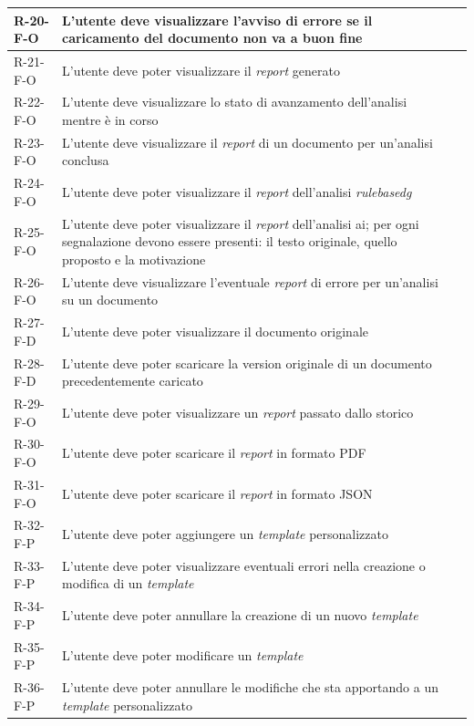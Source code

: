 \begin{xltabular}{\textwidth}{lXl}
    R-20-F-O & L'utente deve visualizzare l'avviso di errore se il caricamento del documento non va a buon fine &  \\ \hline
    R-21-F-O & L'utente deve poter visualizzare il \emph{report} generato &  \\ \hline
    R-22-F-O & L'utente deve visualizzare lo stato di avanzamento dell'analisi mentre è in corso &  \\ \hline
    R-23-F-O & L'utente deve visualizzare il \emph{report} di un documento per un'analisi conclusa &  \\ \hline
    R-24-F-O & L'utente deve poter visualizzare il \emph{report} dell'analisi \emph{\gls{rulebasedg}} &  \\ \hline
    R-25-F-O & L'utente deve poter visualizzare il \emph{report} dell'analisi ai; per ogni segnalazione devono essere presenti: il testo originale, quello proposto e la motivazione &  \\ \hline
    R-26-F-O & L'utente deve visualizzare l'eventuale \emph{report} di errore per un'analisi su un documento &  \\ \hline
    R-27-F-D & L'utente deve poter visualizzare il documento originale &  \\ \hline
    R-28-F-D & L'utente deve poter scaricare la version originale di un documento precedentemente caricato &  \\ \hline
    R-29-F-O & L'utente deve poter visualizzare un \emph{report} passato dallo storico &  \\ \hline
    R-30-F-O & L'utente deve poter scaricare il \emph{report} in formato PDF &  \\ \hline
    R-31-F-O & L'utente deve poter scaricare il \emph{report} in formato JSON &  \\ \hline
    R-32-F-P & L'utente deve poter aggiungere un \emph{template} personalizzato &  \\ \hline
    R-33-F-P & L'utente deve poter visualizzare eventuali errori nella creazione o modifica di un \emph{template} &  \\ \hline
    R-34-F-P & L'utente deve poter annullare la creazione di un nuovo \emph{template} &  \\ \hline
    R-35-F-P & L'utente deve poter modificare un \emph{template} &  \\ \hline
    R-36-F-P & L'utente deve poter annullare le modifiche che sta apportando a un \emph{template} personalizzato &  \\ \hline

\end{xltabular}
